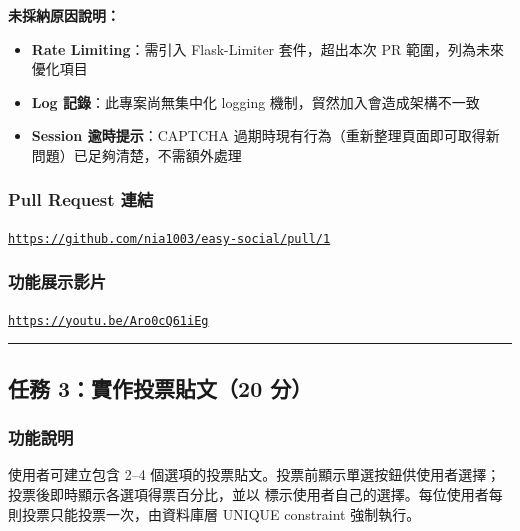 \documentclass[12pt, a4paper]{article}
\begin{document}
\textbf{未採納原因說明：}
\begin{itemize}[leftmargin=2em]
  \item \textbf{Rate Limiting}：需引入 Flask-Limiter 套件，超出本次 PR 範圍，列為未來優化項目
  \item \textbf{Log 記錄}：此專案尚無集中化 logging 機制，貿然加入會造成架構不一致
  \item \textbf{Session 逾時提示}：CAPTCHA 過期時現有行為（重新整理頁面即可取得新問題）已足夠清楚，不需額外處理
\end{itemize}

\subsubsection*{Pull Request 連結}

\begin{tcolorbox}[colback=lightgreen, colframe=green!60!black, title=PR \#1 連結（已合併）]
\href{https://github.com/nia1003/easy-social/pull/1}{\texttt{https://github.com/nia1003/easy-social/pull/1}}
\end{tcolorbox}

\subsubsection*{功能展示影片}

\begin{tcolorbox}[colback=lightgreen, colframe=green!60!black, title=功能展示影片（YouTube）]
\href{https://youtu.be/Aro0cQ61iEg}{\texttt{https://youtu.be/Aro0cQ61iEg}}
\end{tcolorbox}

\bigskip
\hrule
\bigskip

\subsection*{任務 3：實作投票貼文（20 分）}

\subsubsection*{功能說明}

使用者可建立包含 2--4 個選項的投票貼文。投票前顯示單選按鈕供使用者選擇；投票後即時顯示各選項得票百分比，並以 \checkmark{} 標示使用者自己的選擇。每位使用者每則投票只能投票一次，由資料庫層 UNIQUE constraint 強制執行。
\end{document}
